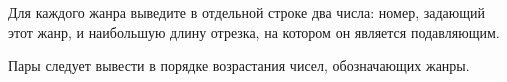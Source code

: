 Для каждого жанра выведите в отдельной строке два числа: номер, задающий этот жанр, и наибольшую длину отрезка, на котором он является подавляющим.

Пары следует вывести в порядке возрастания чисел, обозначающих жанры.